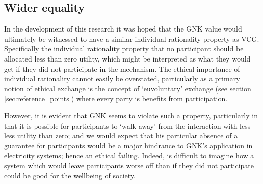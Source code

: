 


\subsection{Wider equality}

In the development of this research it was hoped that the GNK value would ultimately be witnessed to have a similar individual rationality property as VCG.
Specifically the individual rationality property that no participant should be allocated less than zero utility, which might be interpreted as what they would get if they did not participate in the mechanism.
The ethical importance of individual rationality cannot easily be overstated, particularly as a primary notion of ethical exchange is the concept of `euvoluntary' exchange (see section \ref{sec:reference_points}) where every party is benefits from participation.

However, it is evident that GNK seems to violate such a property, particularly in that it is possible for participants to `walk away' from the interaction with less less utility than zero; and we would expect that his particular absence of a guarantee for participants would be a major hindrance to GNK's application in electricity systems; hence an ethical failing.
Indeed, is difficult to imagine how a system which would leave participants worse off than if they did not participate could be good for the wellbeing of society.


